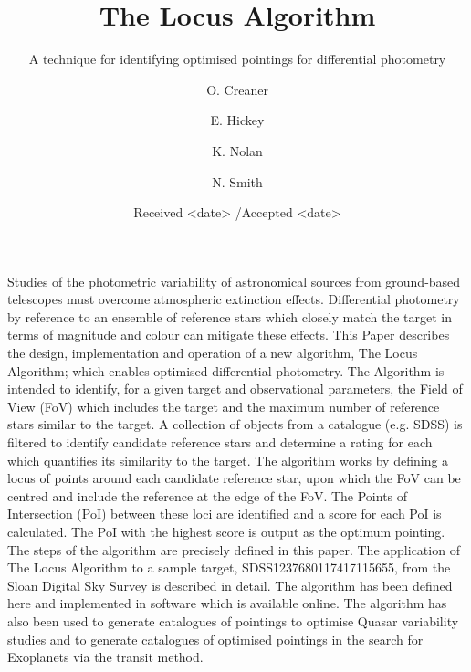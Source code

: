 \documentclass[referee]{aa}
\begin{document}

\title{The Locus Algorithm}
\subtitle{A technique for identifying optimised pointings for differential photometry}


\author{O. Creaner
\and
E. Hickey
\and
K. Nolan
\and
N. Smith
}


\date{Received <date> /Accepted <date>}
\abstract{}{}{}{}{} 
\abstract 
  {Studies of the photometric variability of astronomical sources from ground-based telescopes must overcome atmospheric extinction effects.  Differential photometry by reference to an ensemble of reference stars which closely match the target in terms of magnitude and colour can mitigate these effects.}
  {This Paper describes the design, implementation and operation of a new algorithm, The Locus Algorithm; which enables optimised differential photometry.  The Algorithm is intended to identify, for a given target and observational parameters, the Field of View (FoV) which includes the target and the maximum number of reference stars similar to the target.}
   {A collection of objects from a catalogue (e.g. SDSS) is filtered to identify candidate reference stars and determine a rating for each which quantifies its similarity to the target.  The algorithm works by defining a locus of points around each candidate reference star, upon which the FoV can be centred and include the reference at the edge of the FoV.  The Points of Intersection (PoI) between these loci are identified and a score for each PoI is calculated.  The PoI with the highest score is output as the optimum pointing.}
   {The steps of the algorithm are precisely defined in this paper. The application of The Locus Algorithm to a sample target, SDSS1237680117417115655, from the Sloan Digital Sky Survey is described in detail. }
   {The algorithm has been defined here and implemented in software which is available online. The algorithm has also been used to generate catalogues of pointings to optimise Quasar variability studies and to generate catalogues of optimised pointings in the search for Exoplanets via the transit method.}  
\end{document}
